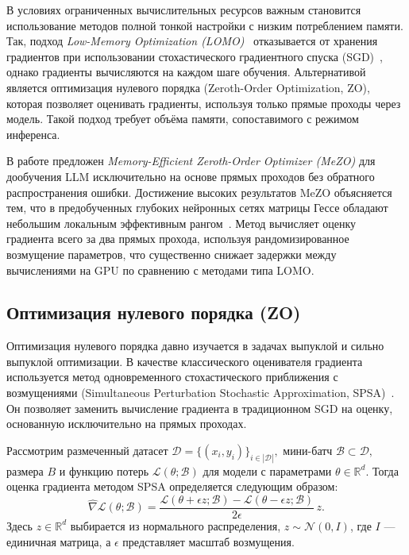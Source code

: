 \documentclass[LI,KR]{HSEUniversity}
\begin{document}
В условиях ограниченных вычислительных ресурсов важным становится использование методов полной тонкой настройки с низким потреблением памяти.
Так, подход \emph{Low-Memory Optimization (LOMO)}~\cite{adalomo} отказывается от хранения градиентов при использовании стохастического градиентного спуска (SGD)~\cite{sgd, sgd-analysis}, однако градиенты вычисляются на каждом шаге обучения.
Альтернативой является оптимизация нулевого порядка (Zeroth-Order Optimization, ZO), которая позволяет оценивать градиенты, используя только прямые проходы через модель.
Такой подход требует объёма памяти, сопоставимого с режимом инференса.

В работе \cite{mezo} предложен \emph{Memory-Efficient Zeroth-Order Optimizer (MeZO)} для дообучения LLM исключительно на основе прямых проходов без обратного распространения ошибки.
Достижение высоких результатов MeZO объясняется тем, что в предобученных глубоких нейронных сетях матрицы Гессе обладают небольшим локальным эффективным рангом~\cite{hessianrank1, hessianrank2, hessianrank3}.
Метод вычисляет оценку градиента всего за два прямых прохода, используя рандомизированное возмущение параметров, что существенно снижает задержки между вычислениями на GPU по сравнению с методами типа LOMO.

\subsection{Оптимизация нулевого порядка (ZO)}\label{subsec:ZO}
Оптимизация нулевого порядка давно изучается в задачах выпуклой и сильно выпуклой оптимизации.
В качестве классического оценивателя градиента используется метод одновременного стохастического приближения с возмущениями (Simultaneous Perturbation Stochastic Approximation, SPSA)~\cite{spsa}.
Он позволяет заменить вычисление градиента в традиционном SGD на оценку, основанную исключительно на прямых проходах.

Рассмотрим размеченный датасет
$
\mathcal{D} = \{(x_i, y_i)\}_{i\in|\mathcal{D}|},
$
мини-батч
$
\mathcal{B} \subset \mathcal{D},
$
размера $B$ и функцию потерь $\mathcal{L}(\theta; \mathcal{B})$ для модели с параметрами $\theta \in \mathbb{R}^d$.
Тогда оценка градиента методом SPSA определяется следующим образом:
$$
\widehat{\nabla} \mathcal{L}(\theta; \mathcal{B}) = \frac{\mathcal{L}(\theta + \epsilon z; \mathcal{B}) - \mathcal{L}(\theta - \epsilon z; \mathcal{B})}{2\epsilon}\, z.
$$
Здесь $z \in \mathbb{R}^d$ выбирается из нормального распределения, $z \sim \mathcal{N}(0, I)$, где $I$ — единичная матрица, а $\epsilon$ представляет масштаб возмущения.
\end{document}
